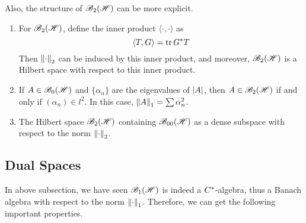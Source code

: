 Also, the structure of $\mathscr{B}_{2}\mathscr{(H)}$ can be more explicit.

\begin{thm}
	\begin{enumerate}[label = \arabic*)]
		\item For $\mathscr{B}_{2}\mathscr{(H)}$, define the inner product $\langle \cdot,\cdot \rangle$ as
		\begin{equation*}
			\langle T,G \rangle = \operatorname{tr}{G^{*}T}
		\end{equation*}
		Then $\left\lVert\cdot\right\lVert_2$ can be induced by this inner product, and moreover, $\mathscr{B}_{2}\mathscr{(H)}$ is a Hilbert space with respect to this inner product.
		\item If $A \in \mathscr{B}_{0}\mathscr{(H)}$ and $\{\alpha_n\}$ are the eigenvalues of $\left\lvert A\right\lvert$, then $A \in \mathscr{B}_{2}\mathscr{(H)}$ if and only if $(\alpha_n) \in l^{2}$. In this case, $\left\lVert A\right\lVert_1 = \sum \alpha_n^2$.
		\item The Hilbert space $\mathscr{B}_{2}\mathscr{(H)}$ containing $\mathscr{B}_{00}\mathscr{(H)}$ as a dense subspace with respect to the norm $\left\lVert\cdot\right\lVert_2$.
	\end{enumerate}
\end{thm}

\subsection{Dual Spaces}

In above subsection, we have seen $\mathscr{B}_{1}\mathscr{(H)}$ is indeed a $C^{*}$-algebra, thus a Banach algebra with respect to the norm $\left\lVert\cdot\right\lVert_1$. Therefore, we can get the following important properties.

